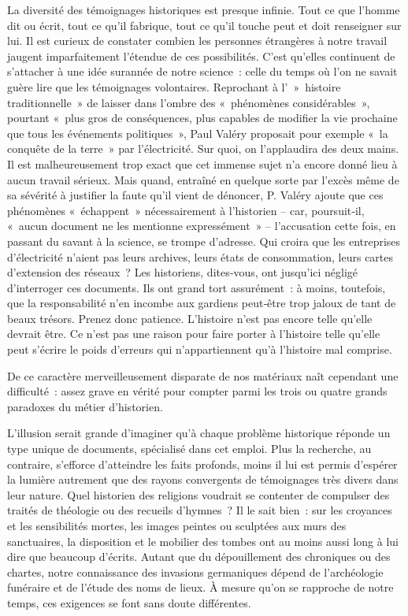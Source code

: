 \documentclass[french,twoside]{book} %
\newcommand{\astermono}{\medskip\centerline{\color{rubric}\large\selectfont{\syms ✻}}\medskip\par}%
\begin{document}
\astermono

\noindent  {}
\label{p27} La diversité des témoignages historiques est presque infinie. Tout ce que l’homme dit ou écrit, tout ce qu’il fabrique, tout ce qu’il touche peut et doit renseigner sur lui. Il est curieux de constater combien les personnes étrangères à notre travail jaugent imparfaitement l’étendue de ces possibilités. C’est qu’elles continuent de s’attacher à une idée surannée de notre science : celle du temps où l’on ne savait guère lire que les témoignages volontaires. Reprochant à l’ » histoire traditionnelle » de laisser dans l’ombre des « phénomènes considérables », pourtant « plus gros de conséquences, plus capables de modifier la vie prochaine que tous les événements politiques », Paul Valéry proposait pour exemple « la conquête de la terre » par l’électricité. Sur quoi, on l’applaudira des deux mains. Il est malheureusement trop exact que cet immense sujet n’a encore donné lieu à aucun travail sérieux. Mais quand, entraîné en quelque sorte par l’excès même de sa sévérité à justifier la faute qu’il vient de dénoncer, P. Valéry ajoute que ces phénomènes « échappent » nécessairement à l’historien – car, poursuit‑il, « aucun document ne les mentionne expressément » – l’accusation cette fois, en passant du savant à la science, se trompe d’adresse. Qui croira que les entreprises d’électri­cité n’aient pas leurs archives, leurs états de consommation, leurs cartes d’extension des réseaux ? Les historiens, dites‑vous, ont jusqu’ici négligé d’interroger ces documents. Ils ont grand tort assurément : à moins, toutefois, que la responsabilité n’en incombe aux gardiens peut‑être trop jaloux de tant de beaux trésors. Prenez donc patience. L’histoire n’est pas encore telle qu’elle devrait être. Ce n’est pas une raison pour faire porter à l’histoire telle qu’elle peut s’écrire le poids d’erreurs qui n’ap­partiennent qu’à l’histoire mal comprise.\par
De ce caractère merveilleusement disparate de nos matériaux naît cependant une difficulté : assez grave en vérité pour compter parmi les trois ou quatre grands paradoxes du métier d’historien.\par
L’illusion serait grande d’imaginer qu’à chaque problème historique réponde un type unique de documents, spécialisé dans cet emploi. Plus la recherche, au contraire, s’efforce d’atteindre les faits profonds, moins il lui est permis d’espérer la lumière autrement que des rayons conver­gents de témoignages très divers dans leur nature. Quel historien des religions voudrait se contenter de compulser des traités de théologie ou des recueils d’hymnes ? Il le sait bien : sur les croyances et les sensibilités mortes, les images peintes ou sculptées aux murs des sanctuaires, la disposition et le mobilier des tombes ont au moins aussi long à lui dire que beaucoup d’écrits. Autant que du dépouillement des chroniques ou des chartes, notre connaissance des invasions germaniques dépend de l’archéologie funéraire et de l’étude des noms de lieux. À mesure qu’on se rapproche de notre temps, ces exigences se font sans doute différentes.\par
\end{document}

